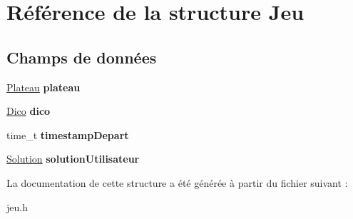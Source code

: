 \hypertarget{structJeu}{\section{Référence de la structure Jeu}
\label{structJeu}
}
\subsection*{Champs de données}
\begin{DoxyCompactItemize}
\item 
\hypertarget{structJeu_af2931c71f6de940ec7ed3fcd2f9d7158}{\hyperlink{structPlateau}{Plateau} {\bfseries plateau}}\label{structJeu_af2931c71f6de940ec7ed3fcd2f9d7158}

\item 
\hypertarget{structJeu_a6bda384c6fca4e83ae15ac69f2228a41}{\hyperlink{structDico}{Dico} {\bfseries dico}}\label{structJeu_a6bda384c6fca4e83ae15ac69f2228a41}

\item 
\hypertarget{structJeu_af48a5fddf1dc40b7c4a85918d73f201d}{time\-\_\-t {\bfseries timestamp\-Depart}}\label{structJeu_af48a5fddf1dc40b7c4a85918d73f201d}

\item 
\hypertarget{structJeu_ae8e1dca71285915404d1de4ff609a1d6}{\hyperlink{structSolution}{Solution} {\bfseries solution\-Utilisateur}}\label{structJeu_ae8e1dca71285915404d1de4ff609a1d6}

\end{DoxyCompactItemize}


La documentation de cette structure a été générée à partir du fichier suivant \-:\begin{DoxyCompactItemize}
\item 
jeu.\-h\end{DoxyCompactItemize}
